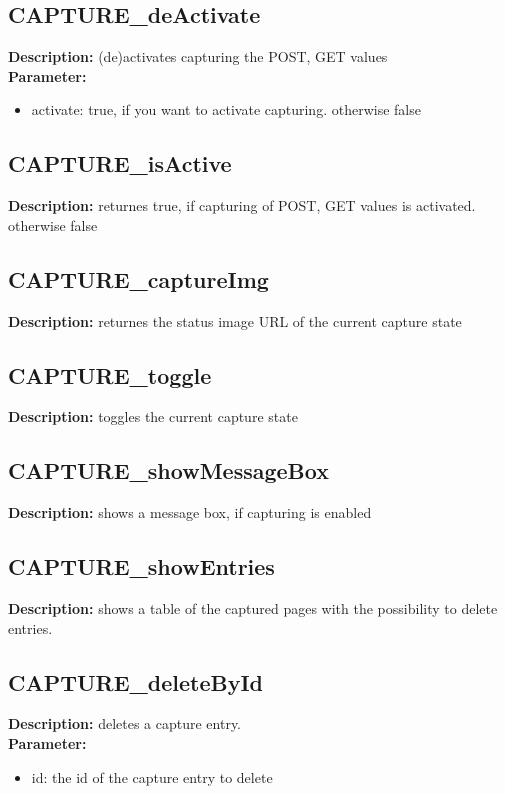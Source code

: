 \subsection{CAPTURE\_deActivate}
\textbf{Description:} (de)activates capturing the POST, GET values\\
\textbf{Parameter:}
\begin{itemize}
\item activate: true, if you want to activate capturing. otherwise false
\end{itemize}

\subsection{CAPTURE\_isActive}
\textbf{Description:} returnes true, if capturing of POST, GET values is activated. otherwise false\\

\subsection{CAPTURE\_captureImg}
\textbf{Description:} returnes the status image URL of the current capture state\\

\subsection{CAPTURE\_toggle}
\textbf{Description:} toggles the current capture state\\

\subsection{CAPTURE\_showMessageBox}
\textbf{Description:} shows a message box, if capturing is enabled\\

\subsection{CAPTURE\_showEntries}
\textbf{Description:} shows a table of the captured pages with the possibility to delete entries.\\

\subsection{CAPTURE\_deleteById}
\textbf{Description:} deletes a capture entry.\\
\textbf{Parameter:}
\begin{itemize}
\item id: the id of the capture entry to delete
\end{itemize}

